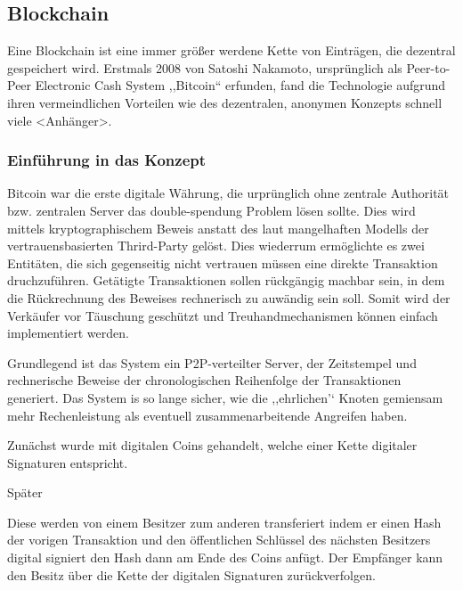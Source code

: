 \subsection{Blockchain}
    Eine Blockchain ist eine immer größer werdene Kette von Einträgen, die dezentral gespeichert wird. 
    Erstmals 2008 von Satoshi Nakamoto, ursprünglich als Peer-to-Peer Electronic Cash System ,,Bitcoin`` erfunden, fand die Technologie aufgrund ihren vermeindlichen Vorteilen wie des dezentralen, anonymen Konzepts schnell viele <Anhänger>. 
    
    \subsubsection{Einführung in das Konzept}
    Bitcoin war die erste digitale Währung, die urprünglich ohne zentrale Authorität bzw. zentralen Server das double-spendung Problem lösen sollte\cite{Nakamoto2008}. 
    Dies wird mittels kryptographischem Beweis anstatt des laut \citeauthor{Nakamoto2008} mangelhaften Modells der vertrauensbasierten Thrird-Party gelöst.
    Dies wiederrum ermöglichte es zwei Entitäten, die sich gegenseitig nicht vertrauen müssen eine direkte Transaktion druchzuführen.
    Getätigte Transaktionen sollen rückgängig machbar sein, in dem die Rückrechnung des Beweises rechnerisch zu auwändig sein soll\cite{Nakamoto2008}.
    Somit wird der Verkäufer vor Täuschung geschützt und Treuhandmechanismen können einfach implementiert werden.  
    
    Grundlegend ist das System ein P2P-verteilter Server, der Zeitstempel und rechnerische Beweise der chronologischen Reihenfolge der Transaktionen generiert\cite{Nakamoto2008}.
    Das System is so lange sicher, wie die ,,ehrlichen'` Knoten gemiensam mehr Rechenleistung als eventuell zusammenarbeitende Angreifen haben\cite{Nakamoto2008}.
    
    Zunächst wurde mit digitalen Coins gehandelt, welche einer Kette digitaler Signaturen entspricht.
    
    Später 
    
    Diese werden von einem Besitzer zum anderen transferiert indem er einen Hash der vorigen Transaktion und den öffentlichen Schlüssel des nächsten Besitzers digital signiert den Hash dann am Ende des Coins anfügt.
    Der Empfänger kann den Besitz über die Kette der digitalen Signaturen zurückverfolgen\cite{Nakamoto2008}.
    
